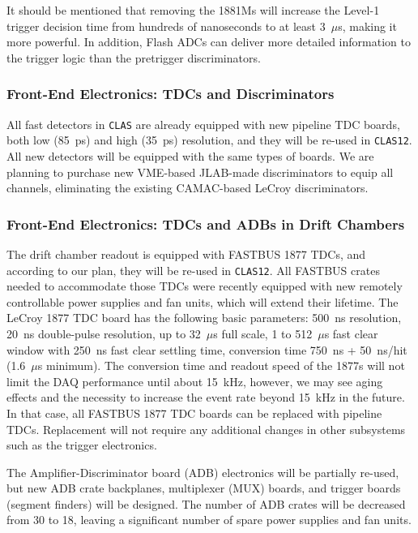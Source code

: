It should be mentioned that removing the 1881Ms will increase the Level-1 
trigger decision time from hundreds of nanoseconds to at least 3~$\mu$s, 
making it more powerful.  In addition, Flash ADCs can deliver more 
detailed information to the trigger logic than the pretrigger discriminators.

\subsubsection{Front-End Electronics: TDCs and Discriminators}

All fast detectors in {\tt CLAS} are already equipped with new pipeline TDC
boards, both low (85~ps) and high (35~ps) resolution, and they will be
re-used in {\tt CLAS12}.  All new detectors will be equipped with the same
types of boards.  We are planning to purchase new VME-based JLAB-made
discriminators to equip all channels, eliminating the existing CAMAC-based 
LeCroy discriminators.

\subsubsection{Front-End Electronics: TDCs and ADBs in Drift Chambers}

The drift chamber readout is equipped with FASTBUS 1877 TDCs, and according 
to our plan, they will be re-used in {\tt CLAS12}.  All FASTBUS crates
needed to accommodate those TDCs were recently equipped with new remotely 
controllable power supplies and fan units, which will extend their lifetime. 
The LeCroy 1877 TDC board has the following basic parameters: 500~ns
resolution, 20~ns double-pulse resolution, up to 32~$\mu$s full scale, 
1 to 512~$\mu$s fast clear window with 250~ns fast clear settling time, 
conversion time 750~ns + 50~ns/hit (1.6~$\mu$s minimum). The conversion time
and readout speed of the 1877s will not limit the DAQ performance until about 
15~kHz, however, we may see aging effects and the necessity to increase the 
event rate beyond 15~kHz in the future.  In that case, all FASTBUS 1877
TDC boards can be replaced with pipeline TDCs. Replacement will not require 
any additional changes in other subsystems such as the trigger electronics.

The Amplifier-Discriminator board (ADB) electronics will be partially re-used,
but new ADB crate backplanes, multiplexer (MUX) boards, and trigger boards 
(segment finders) will be designed.  The number of ADB crates will be decreased 
from 30 to 18, leaving a significant number of spare power supplies and fan units.

